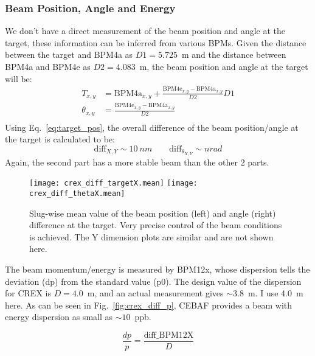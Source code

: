 \subsubsection{Beam Position, Angle and Energy}
We don't have a direct measurement of the beam position and angle at the target, these 
information can be inferred from various BPMs. Given the 
distance between the target and BPM4a as $D1 = 5.725$~m and the distance
between BPM4a and BPM4e as $D2 =4.083$~m, the beam position and angle at the target 
will be:
\begin{equation}
    \begin{aligned}
	T_{x,y} &= \text{BPM4a}_{x,y} + \frac{\text{BPM4e}_{x,y} - \text{BPM4a}_{x,y}}{D2} D1	\\
	\theta_{x,y} &= \frac{\text{BPM4e}_{x,y} - \text{BPM4a}_{x,y}}{D2} \\
    \end{aligned}
    \label{eq:target_pos}
\end{equation}
Using Eq.~\ref{eq:target_pos}, the overall difference of the beam position/angle 
at the target is calculated to be:
\begin{equation*}
    \text{diff}_{X,Y} \sim 10\ nm	\qquad \text{diff}_{\theta_{X,Y}} \sim nrad	
\end{equation*}
Again, the second part has a more stable beam than the other 2 parts.

\begin{figure}[!h]
    \centering
    \texttt{[image: crex\_diff\_targetX.mean]}
    \texttt{[image: crex\_diff\_thetaX.mean]}
    \caption{Slug-wise mean value of the beam position (left) and angle (right) 
    difference at the target. 
    Very precise control of the beam conditions is achieved.
    The Y dimension plots are similar and are not shown here.}
\end{figure}


The beam momentum/energy is measured by BPM12x, whose dispersion tells the deviation
(dp) from the standard value (p0). The design value of the dispersion for CREX is
$D = 4.0$~m, and an actual measurement gives $\sim3.8$~m. I use 4.0~m here.
As can be seen in Fig.~\ref{fig:crex_diff_p}, CEBAF provides a beam with energy 
dispersion as small as $\sim10$~ppb.

\begin{equation}
    \frac{dp}{p} = \frac{\text{diff\_BPM12X}}{D}
\end{equation}

